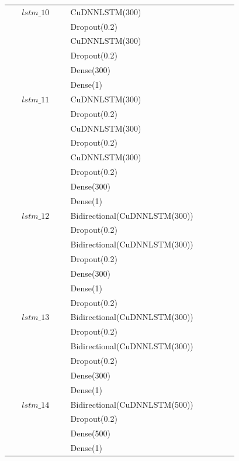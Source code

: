 \begin{longtable}{| c | m{0.58\linewidth} | r | m{0.1\linewidth} |}
    $lstm\_10$  & CuDNNLSTM(300)                \\
                & Dropout(0.2)                  \\
                & CuDNNLSTM(300)                \\
                & Dropout(0.2)                  \\
                & Dense(300)                    \\
                & Dense(1)                      \\ \hline
    $lstm\_11$  & CuDNNLSTM(300)                \\
                & Dropout(0.2)                  \\
                & CuDNNLSTM(300)                \\
                & Dropout(0.2)                  \\
                & CuDNNLSTM(300)                \\
                & Dropout(0.2)                  \\
                & Dense(300)                    \\
                & Dense(1)                      \\ \hline
    $lstm\_12$  & Bidirectional(CuDNNLSTM(300)) \\
                & Dropout(0.2)                  \\
                & Bidirectional(CuDNNLSTM(300)) \\
                & Dropout(0.2)                  \\
                & Dense(300)                    \\
                & Dense(1)                      \\ \hline
                & Dropout(0.2)                  \\
    $lstm\_13$  & Bidirectional(CuDNNLSTM(300)) \\
                & Dropout(0.2)                  \\
                & Bidirectional(CuDNNLSTM(300)) \\
                & Dropout(0.2)                  \\
                & Dense(300)                    \\
                & Dense(1)                      \\ \hline

    $lstm\_14$  & Bidirectional(CuDNNLSTM(500)) \\
                & Dropout(0.2)                  \\
                & Dense(500)                    \\
                & Dense(1)                      \\ \hline


\end{longtable}
